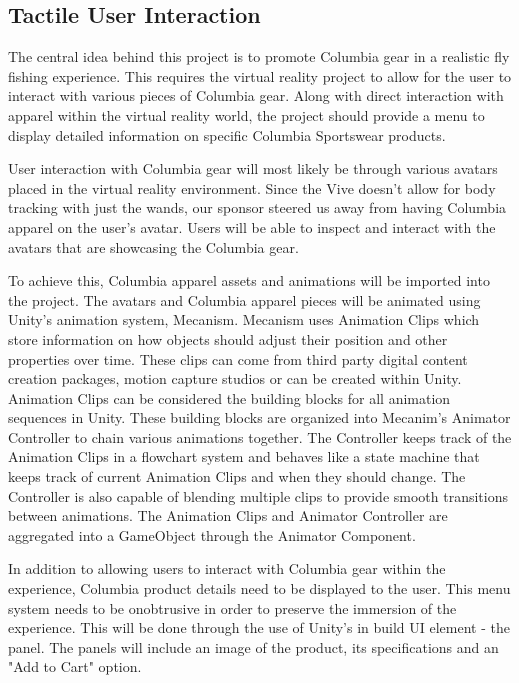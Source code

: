 \documentclass[10pt,journal,compsoc,onecolumn, draftclsnofoot]{IEEEtran}
\begin{document}
\subsection{Tactile User Interaction}
The central idea behind this project is to promote Columbia gear in a realistic fly fishing experience. This requires the virtual reality project to allow for the user to interact with various pieces of Columbia gear. Along with direct interaction with apparel within the virtual reality world, the project should provide a menu to display detailed information on specific Columbia Sportswear products.

User interaction with Columbia gear will most likely be through various avatars placed in the virtual reality environment. Since the Vive doesn't allow for body tracking with just the wands, our sponsor steered us away from having Columbia apparel on the user's avatar. Users will be able to inspect and interact with the avatars that are showcasing the Columbia gear.

To achieve this, Columbia apparel assets and animations will be imported into the project. The avatars and Columbia apparel pieces will be animated using Unity's animation system, Mecanism. Mecanism uses Animation Clips which store information on how objects should adjust their position and other properties over time. These clips can come from third party digital content creation packages, motion capture studios or can be created within Unity. Animation Clips can be considered the building blocks for all animation sequences in Unity. These building blocks are organized into Mecanim's Animator Controller to chain various animations together. The Controller keeps track of the Animation Clips in a flowchart system and behaves like a state machine that keeps track of current Animation Clips and when they should change. The Controller is also capable of blending multiple clips to provide smooth transitions between animations. The Animation Clips and Animator Controller are aggregated into a GameObject through the Animator Component.\cite{unity_animation}

In addition to allowing users to interact with Columbia gear within the experience, Columbia product details need to be displayed to the user. This menu system needs to be onobtrusive in order to preserve the immersion of the experience. This will be done through the use of Unity's in build UI element - the panel. The panels will include an image of the product, its specifications and an "Add to Cart" option.
\end{document}
